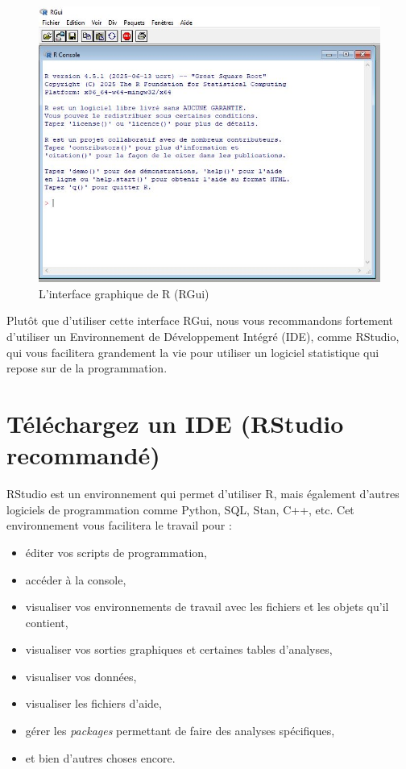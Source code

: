 \documentclass[
]{book}
\providecommand{\tightlist}{%
  \setlength{\itemsep}{0pt}\setlength{\parskip}{0pt}}
\begin{document}
\begin{figure}

{\centering \includegraphics[width=0.5\linewidth]{./images/Rgui} 

}

\caption{L'interface graphique de R (RGui)}\label{fig:RGui}
\end{figure}

Plutôt que d'utiliser cette interface RGui, nous vous recommandons fortement d'utiliser un Environnement de Développement Intégré (IDE), comme RStudio, qui vous facilitera grandement la vie pour utiliser un logiciel statistique qui repose sur de la programmation.

\section{Téléchargez un IDE (RStudio recommandé)}\label{tuxe9luxe9chargez-un-ide-rstudio-recommanduxe9}

RStudio est un environnement qui permet d'utiliser R, mais également d'autres logiciels de programmation comme Python, SQL, Stan, C++, etc. Cet environnement vous facilitera le travail pour :

\begin{itemize}
\tightlist
\item
  éditer vos scripts de programmation,
\item
  accéder à la console,
\item
  visualiser vos environnements de travail avec les fichiers et les objets qu'il contient,
\item
  visualiser vos sorties graphiques et certaines tables d'analyses,
\item
  visualiser vos données,
\item
  visualiser les fichiers d'aide,
\item
  gérer les \emph{packages} permettant de faire des analyses spécifiques,
\item
  et bien d'autres choses encore.
\end{itemize}
\end{document}
